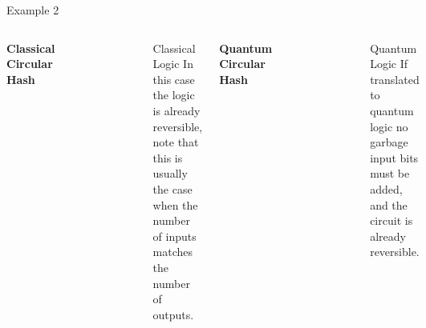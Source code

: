 \documentclass[pdf]{beamer}
\begin{document}
\begin{frame}{Example 2}
\begin{columns}
\vspace{-1 em}
\begin{center}
\textbf{Classical Circular Hash}
\end{center}
\vspace{-1 em}
\begin{figure}[ht]
\begin{center}
\includegraphics[scale=0.275]{figures/fbch.png}
\end{center}
\end{figure}
\begin{block}{Classical Logic}
In this case the logic is already reversible, note that this is usually the case when the number of inputs matches the number of outputs.
\end{block}
\vspace{-1 em}
\begin{center}
\textbf{Quantum Circular Hash}
\end{center}
\begin{figure}[ht]
\begin{center}
\vspace{2 em}
  \includegraphics[scale=0.4]{figures/4-bit_circular_hash_qc.png}
\end{center}
\end{figure}
\begin{block}{Quantum Logic}
If translated to quantum logic no garbage input bits must be added, and the circuit is already reversible. 
\end{block}
\end{columns}

\end{frame}
\end{document}
